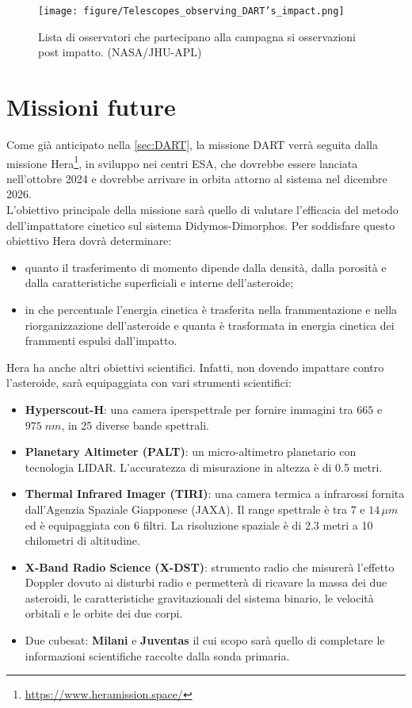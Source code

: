 \documentclass[a4paper,11pt,openright]{book}
\begin{document}
\begin{figure}[!h]
    \centering
    \texttt{[image: figure/Telescopes\_observing\_DART's\_impact.png]}
    \caption[Osservatori che hanno osservato l'impatto di DART.]{Lista di osservatori che partecipano alla campagna si osservazioni post impatto. (NASA/JHU-APL)}
    \label{fig:obs_dart}
\end{figure}

\section{Missioni future}\label{sec:hera}
Come già anticipato nella \cref{sec:DART}, la missione DART verrà seguita dalla missione Hera\footnote{\href{https://www.heramission.space/}{https://www.heramission.space/}}, in sviluppo nei centri ESA, che dovrebbe essere lanciata nell'ottobre 2024 e dovrebbe arrivare in orbita attorno al sistema nel dicembre 2026.\\
L'obiettivo principale della missione sarà quello di valutare l'efficacia del metodo dell'impattatore cinetico sul sistema Didymos-Dimorphos. Per soddisfare questo obiettivo Hera dovrà determinare: 
\begin{itemize}
    \item quanto il trasferimento di momento dipende dalla densità, dalla porosità e dalla caratteristiche superficiali e interne dell'asteroide;
    \item in che percentuale l'energia cinetica è trasferita nella frammentazione e nella riorganizzazione dell'asteroide e quanta è trasformata in energia cinetica dei frammenti espulsi dall'impatto.
\end{itemize}
Hera ha anche altri obiettivi scientifici. Infatti, non dovendo impattare contro l'asteroide, sarà equipaggiata con vari strumenti scientifici:
\begin{itemize}
    \item \textbf{Hyperscout-H}: una camera iperspettrale per fornire immagini tra $665$ e $975\; nm$, in 25 diverse bande spettrali.
    \item \textbf{Planetary Altimeter (PALT)}: un micro-altimetro planetario con tecnologia LIDAR. L'accuratezza di misurazione in altezza è di 0.5 metri.
    \item \textbf{Thermal Infrared Imager (TIRI)}: una camera termica a infrarossi fornita dall'Agenzia Spaziale Giapponese (JAXA). Il range spettrale è tra $7$ e $14\,\mu m$ ed è equipaggiata con 6 filtri. La risoluzione spaziale è di 2.3 metri a 10 chilometri di altitudine.
    \item \textbf{X-Band Radio Science (X-DST)}: strumento radio che misurerà l'effetto Doppler dovuto ai disturbi radio e permetterà di ricavare la massa dei due asteroidi, le caratteristiche gravitazionali del sistema binario, le velocità orbitali e le orbite dei due corpi.
    \item Due cubesat: \textbf{Milani} e \textbf{Juventas} il cui scopo sarà quello di completare le informazioni scientifiche raccolte dalla sonda primaria.
\end{itemize}
\end{document}
